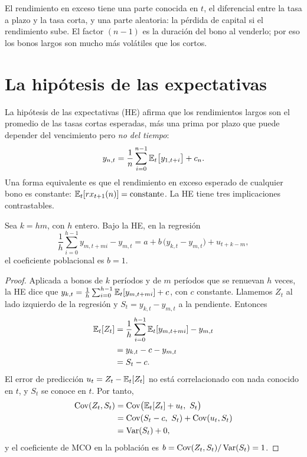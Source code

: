 El rendimiento en exceso tiene una parte conocida en $t$, el diferencial entre la tasa a plazo y la tasa corta, y una
parte aleatoria: la pérdida de capital si el rendimiento sube. El factor $(n-1)$ es la duración del bono al venderlo; por
eso los bonos largos son mucho más volátiles que los cortos.

\section{La hipótesis de las expectativas}

La hipótesis de las expectativas (HE) afirma que los rendimientos largos son el promedio de las tasas cortas esperadas,
más una prima por plazo que puede depender del vencimiento pero \emph{no del tiempo}:
\[
  y_{n,t}=\frac1n\sum_{i=0}^{n-1}\mathbb{E}_t\bigl[y_{1,t+i}\bigr]+c_n .
\]
Una forma equivalente es que el rendimiento en exceso esperado de cualquier bono es constante:
$\mathbb{E}_t[rx_{t+1}(n)]=\text{constante}$. La HE tiene tres implicaciones contrastables.

\begin{proposicion}\label{prop:he1}
Sea $k=hm$, con $h$ entero. Bajo la HE, en la regresión
\[
  \frac1h\sum_{i=0}^{h-1}y_{m,t+mi}-y_{m,t}=a+b\,\bigl(y_{k,t}-y_{m,t}\bigr)+u_{t+k-m},
\]
el coeficiente poblacional es $b=1$.
\end{proposicion}

\begin{proof}
Aplicada a bonos de $k$ períodos y de $m$ períodos que se renuevan $h$ veces, la HE dice que
$y_{k,t}=\frac1h\sum_{i=0}^{h-1}\mathbb{E}_t[y_{m,t+mi}]+c$, con $c$ constante. Llamemos $Z_t$ al lado izquierdo de la regresión y
$S_t=y_{k,t}-y_{m,t}$ a la pendiente. Entonces
\begin{align*}
  \mathbb{E}_t[Z_t] &= \frac1h\sum_{i=0}^{h-1}\mathbb{E}_t[y_{m,t+mi}]-y_{m,t}\\
            &= y_{k,t}-c-y_{m,t}\\
            &= S_t-c .
\end{align*}
El error de predicción $u_t=Z_t-\mathbb{E}_t[Z_t]$ no está correlacionado con nada conocido en $t$, y $S_t$ se conoce en $t$. Por
tanto,
\begin{align*}
  \operatorname{Cov}(Z_t,S_t) &= \operatorname{Cov}\bigl(\mathbb{E}_t[Z_t]+u_t,\ S_t\bigr)\\
                &= \operatorname{Cov}(S_t-c,\ S_t)+\operatorname{Cov}(u_t,S_t)\\
                &= \operatorname{Var}(S_t)+0,
\end{align*}
y el coeficiente de MCO en la población es $b=\operatorname{Cov}(Z_t,S_t)/\operatorname{Var}(S_t)=1$.
\end{proof}

